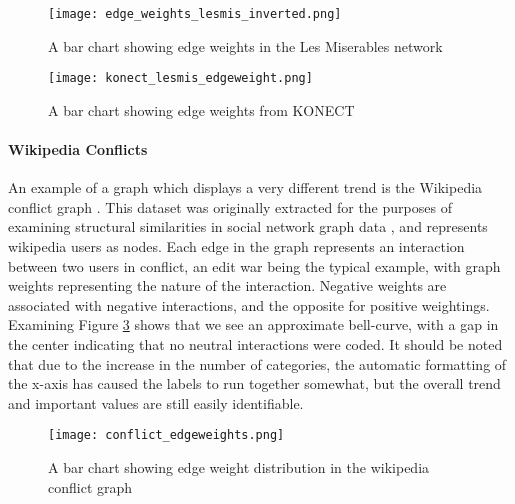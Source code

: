 \begin{figure}
	\centering
	\texttt{[image: edge\_weights\_lesmis\_inverted.png]}
	\caption{A bar chart showing edge weights in the Les Miserables network}
	\label{fig:edgeweightslesmis}
\end{figure}
\begin{figure}
	\centering
	\texttt{[image: konect\_lesmis\_edgeweight.png]}
	\caption{A bar chart showing edge weights from KONECT}
	\label{fig:edgeweightskonect}
\end{figure}

\paragraph{Wikipedia Conflicts}
An example of a graph which displays a very different trend is the Wikipedia conflict graph \cite{konect:2014:wikiconflict}. This dataset was originally extracted for the purposes of examining structural similarities in social network graph data \cite{konect:brandes09}, and represents wikipedia users as nodes. Each edge in the graph represents an interaction between two users in conflict, an edit war being the typical example, with graph weights representing the nature of the interaction. Negative weights are associated with negative interactions, and the opposite for positive weightings. Examining Figure \ref{fig:wiki_conf} shows that we see an approximate bell-curve, with a gap in the center indicating that no neutral interactions were coded. It should be noted that due to the increase in the number of categories, the automatic formatting of the x-axis has caused the labels to run together somewhat, but the overall trend and important values are still easily identifiable. 

\begin{figure}
	\centering
	\texttt{[image: conflict\_edgeweights.png]}
	\caption{A bar chart showing edge weight distribution in the wikipedia conflict graph}
	\label{fig:wiki_conf}
\end{figure}

